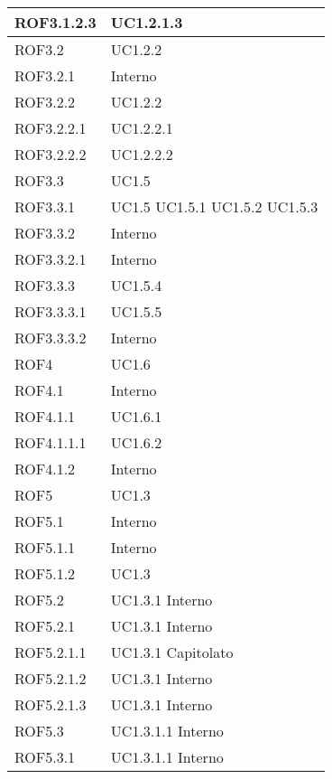 \begin{center}
\begin{longtable}{| p{4cm} | p{4cm} |}
\hline
ROF3.1.2.3   &  UC1.2.1.3 \\
\hline
ROF3.2   &  UC1.2.2 \\
\hline
ROF3.2.1   &  Interno \\
\hline
ROF3.2.2   &  UC1.2.2 \\
\hline
ROF3.2.2.1   &  UC1.2.2.1 \\
\hline
ROF3.2.2.2   &  UC1.2.2.2 \\
\hline
ROF3.3   &  UC1.5 \\
\hline
ROF3.3.1   &  UC1.5 \newline UC1.5.1 \newline UC1.5.2 \newline UC1.5.3 \\
\hline
ROF3.3.2   &  Interno \\
\hline
ROF3.3.2.1   &  Interno \\
\hline
ROF3.3.3   &  UC1.5.4 \\
\hline
ROF3.3.3.1   &  UC1.5.5 \\
\hline
ROF3.3.3.2   &  Interno \\
\hline
ROF4   &  UC1.6 \\
\hline
ROF4.1   &  Interno \\
\hline
ROF4.1.1   &  UC1.6.1 \\
\hline
ROF4.1.1.1   &  UC1.6.2 \\
\hline
ROF4.1.2   &  Interno \\
\hline
ROF5   &  UC1.3 \\
\hline
ROF5.1   &  Interno \\
\hline
ROF5.1.1   &  Interno \\
\hline
ROF5.1.2   &  UC1.3 \\
\hline
ROF5.2   &  UC1.3.1 \newline Interno \\
\hline
ROF5.2.1   &  UC1.3.1 \newline Interno \\
\hline
ROF5.2.1.1   &  UC1.3.1 \newline Capitolato \\
\hline
ROF5.2.1.2   &  UC1.3.1 \newline Interno \\
\hline
ROF5.2.1.3   &  UC1.3.1 \newline Interno \\
\hline
ROF5.3   &  UC1.3.1.1 \newline Interno \\
\hline
ROF5.3.1   &  UC1.3.1.1 \newline Interno \\

\end{longtable}
\end{center}
